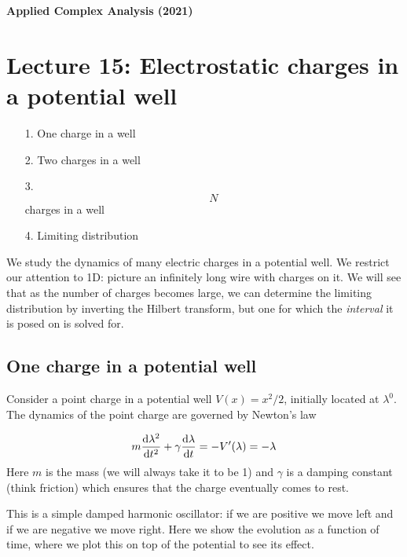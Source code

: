\documentclass[12pt,landscape]{article}
\def\D{ {\rm d} }
\def\dt{\D t}
\begin{document}
{\LARGE
\sf
\textbf{Applied Complex Analysis (2021)}

\section{Lecture 15: Electrostatic charges in a potential well}
\begin{itemize}
\item[1. ] One charge in a well


\item[2. ] Two charges in a well


\item[3. ] \[
N
\]
charges in a well


\item[4. ] Limiting distribution

\end{itemize}
We study the dynamics of many electric charges in a potential well.  We restrict our attention to 1D: picture an infinitely long wire with charges on it. We will see that as the number of charges becomes large, we can determine the limiting distribution by inverting the Hilbert transform, but one for which the \emph{interval} it is posed on is solved for.
\newpage
\subsection{One charge in a potential well}
Consider a point charge in a potential well $V(x) = x^2 / 2$, initially located at $\lambda^0$. The dynamics of the point charge are governed by Newton's law

\[
m { \D \lambda^2 \over \dt^2} + \gamma { \D \lambda \over \dt}  = -V'(\lambda) = -  \lambda
\]
Here $m$ is the mass (we will always take it to be 1) and $\gamma$ is a damping constant (think friction) which ensures that the charge eventually comes to rest.

This is a simple damped harmonic oscillator: if we are positive we move left and if we are negative we move right. Here we show the evolution as a function of time, where we plot this on top of the potential to see its effect.


}
\end{document}
